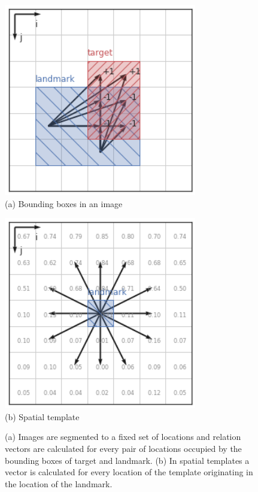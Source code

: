 \begin{figure}
	\centering
	\begin{minipage}{0.5\textwidth}
		\centering
		\includegraphics[width=0.75\textwidth]{studies/sc2020/figures/target_landmark_arrows.png}\\
		(a) Bounding boxes in an image
	\end{minipage}%
	\begin{minipage}{0.5\textwidth}
		\centering
		\includegraphics[width=0.75\textwidth]{studies/sc2020/figures/target_landmark_arrows_spt.png}\\
		(b) Spatial template %
	\end{minipage}%
	\caption{(a) Images are segmented to a fixed set of locations
          and relation vectors are calculated for every pair of
          locations occupied by the bounding boxes of target and
          landmark. (b) In spatial templates a vector is calculated
          for every location of the template originating in the
          location of the landmark.  } \label{sc2020:fig:bbox_vecs}
\end{figure}



